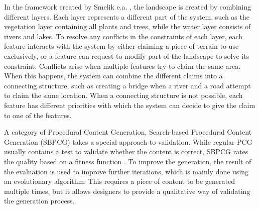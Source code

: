 \documentclass{article}
\begin{document}
In the framework created by Smelik e.a. \cite{smelik_declarative_2011}, the landscape is created by combining different layers. Each layer represents a different part of the system, such as the vegetation layer containing all plants and trees, while the water layer consists of rivers and lakes. To resolve any conflicts in the constraints of each layer, each feature interacts with the system by either claiming a piece of terrain to use exclusively, or a feature can request to modify part of the landscape to solve its constraint. Conflicts arise when multiple features try to claim the same area. When this happens, the system can combine the different claims into a connecting structure, such as creating a bridge when a river and a road attempt to claim the same location. When a connecting structure is not possible, each feature has different priorities with which the system can decide to give the claim to one of the features.

A category of Procedural Content Generation, Search-based Procedural Content Generation (SBPCG) takes a special approach to validation. While regular PCG usually contains a test to validate whether the content is correct, SBPCG rates the quality based on a fitness function \cite{togelius_search-based_2010}. To improve the generation, the result of the evaluation is used to improve further iterations, which is mainly done using an evolutionary algorithm. This requires a piece of content to be generated multiple times, but it allows designers to provide a qualitative way of validating the generation process.


\end{document}
